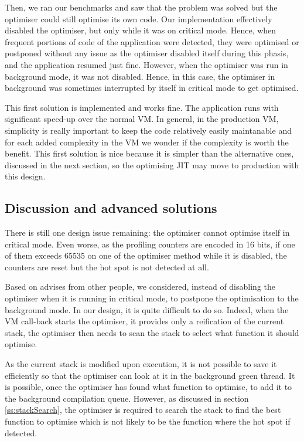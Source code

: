 \documentclass[a4paper,12pt,twoside]{../includes/ThesisStyle}
\begin{document}
Then, we ran our benchmarks and saw that the problem was solved but the optimiser could still optimise its own code. Our implementation effectively disabled the optimiser, but only while it was on critical mode. Hence, when frequent portions of code of the application were detected, they were optimised or postponed without any issue as the optimiser disabled itself during this phasis, and the application resumed just fine. However, when the optimiser was run in background mode, it was not disabled. Hence, in this case, the optimiser in background was sometimes interrupted by itself in critical mode to get optimised.

This first solution is implemented and works fine. The application runs with significant speed-up over the normal VM. In general, in the production VM, simplicity is really important to keep the code relatively easily maintanable and for each added complexity in the VM we wonder if the complexity is worth the benefit. This first solution is nice because it is simpler than the alternative ones, discussed in the next section, so the optimising JIT may move to production with this design.

\subsection{Discussion and advanced solutions}

There is still one design issue remaining: the optimiser cannot optimise itself in critical mode. Even worse, as the profiling counters are encoded in 16 bits, if one of them exceeds 65535 on one of the optimiser method while it is disabled, the counters are reset but the hot spot is not detected at all.

Based on advises from other people, we considered, instead of disabling the optimiser when it is running in critical mode, to postpone the optimisation to the background mode. In our design, it is quite difficult to do so. Indeed, when the VM call-back starts the optimiser, it provides only a reification of the current stack, the optimiser then needs to scan the stack to select what function it should optimise. 

As the current stack is modified upon execution, it is not possible to save it efficiently so that the optimiser can look at it in the background green thread. It is possible, once the optimiser has found what function to optimise, to add it to the background compilation queue. However, as discussed in section \ref{ss:stackSearch}, the optimiser is required to search the stack to find the best function to optimise which is not likely to be the function where the hot spot if detected. 
\end{document}
